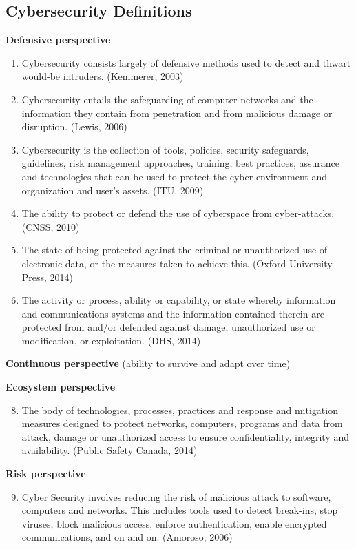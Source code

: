 \subsection{Cybersecurity Definitions}
\textbf{Defensive perspective}

\begin{enumerate}
    \item Cybersecurity consists largely of defensive methods used to detect and thwart would-be intruders. (Kemmerer, 2003)
    \item Cybersecurity entails the safeguarding of computer networks and the information they contain from penetration and from malicious damage or disruption. (Lewis, 2006)
    \item Cybersecurity is the collection of tools, policies, security safeguards, guidelines, risk management approaches, training, best practices, assurance and technologies that can be used to protect the cyber environment and organization and user's assets. (ITU, 2009)
    \item The ability to protect or defend the use of cyberspace from cyber-attacks. (CNSS, 2010)
    \item The state of being protected against the criminal or unauthorized use of electronic data, or the measures taken to achieve this. (Oxford University Press, 2014)
    \item The activity or process, ability or capability, or state whereby information and communications systems and the information contained therein are protected from and/or defended against damage, unauthorized use or modification, or exploitation. (DHS, 2014)
\end{enumerate}

\textbf{Continuous perspective} (ability to survive and adapt over time)


\textbf{Ecosystem perspective}

\begin{enumerate}
    \setcounter{enumi}{7}
    \item The body of technologies, processes, practices and response and mitigation measures designed to protect networks, computers, programs and data from attack, damage or unauthorized access to ensure confidentiality, integrity and availability. (Public Safety Canada, 2014)
\end{enumerate}

\textbf{Risk perspective}

\begin{enumerate}
    \setcounter{enumi}{8}
    \item Cyber Security involves reducing the risk of malicious attack to software, computers and networks. This includes tools used to detect break-ins, stop viruses, block malicious access, enforce authentication, enable encrypted communications, and on and on. (Amoroso, 2006)
\end{enumerate}

